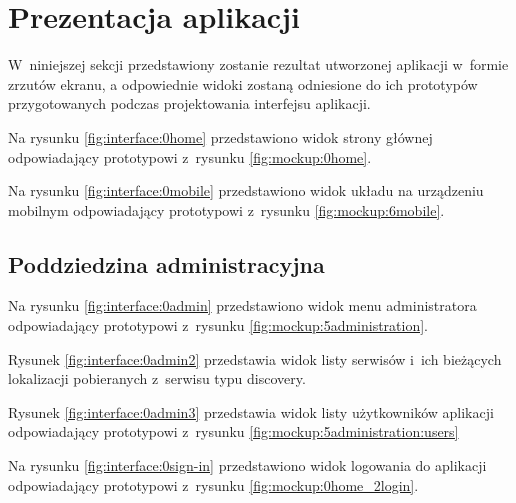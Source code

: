 \section{Prezentacja aplikacji}\label{sec:app-presentation}

W~niniejszej sekcji przedstawiony zostanie rezultat utworzonej aplikacji w~formie zrzutów ekranu,
a odpowiednie widoki zostaną odniesione do ich prototypów przygotowanych podczas projektowania interfejsu aplikacji.

\par
Na rysunku \ref{fig:interface:0home} przedstawiono widok strony głównej odpowiadający prototypowi z~rysunku \ref{fig:mockup:0home}.


Na rysunku \ref{fig:interface:0mobile} przedstawiono widok układu na urządzeniu mobilnym odpowiadający prototypowi z~rysunku \ref{fig:mockup:6mobile}.


\subsection{Poddziedzina administracyjna}

Na rysunku \ref{fig:interface:0admin} przedstawiono widok menu administratora odpowiadający prototypowi z~rysunku \ref{fig:mockup:5administration}.


Rysunek \ref{fig:interface:0admin2} przedstawia widok listy serwisów i~ich bieżących lokalizacji pobieranych z~serwisu typu discovery.


Rysunek \ref{fig:interface:0admin3} przedstawia widok listy użytkowników aplikacji odpowiadający prototypowi z~rysunku \ref{fig:mockup:5administration:users}


Na rysunku \ref{fig:interface:0sign-in} przedstawiono widok logowania do aplikacji odpowiadający prototypowi z~rysunku \ref{fig:mockup:0home_2login}.



